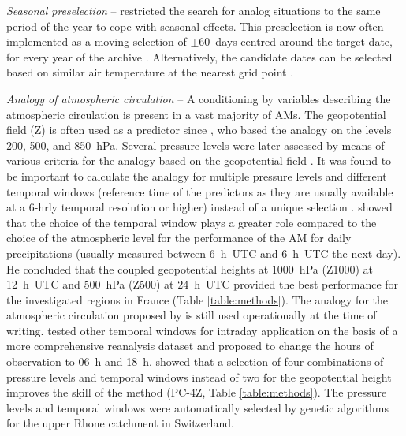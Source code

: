 \documentclass[gmdd]{copernicus}
\begin{document}
\textit{Seasonal preselection} -- \citet{Lorenz1969} restricted the search for analog situations to the same period of the year to cope with seasonal effects. This preselection is now often implemented as a moving selection of $\pm$60~days centred around the target date, for every year of the archive \citep[Table \ref{table:methods},][]{Bontron2004, Marty2012, Horton2012, BenDaoud2016}. Alternatively, the candidate dates can be selected based on similar air temperature at the nearest grid point \citep[Table \ref{table:methods},][]{BenDaoud2016}.

\textit{Analogy of atmospheric circulation} -- A conditioning by variables describing the atmospheric circulation is present in a vast majority of AMs. The geopotential field (Z) is often used as a predictor since \citet{Lorenz1969}, who based the analogy on the levels 200, 500, and 850~hPa. Several pressure levels were later assessed by means of various criteria for the analogy based on the geopotential field \citep{Duband1970, Duband1974, Duband1981, Guilbaud1997}. It was found to be important to calculate the analogy for multiple pressure levels and different temporal windows (reference time of the predictors as they are usually available at a 6-hrly temporal resolution or higher) instead of a unique selection \citep{Guilbaud1998, Obled2002}. \citet{Bontron2004} showed that the choice of the temporal window plays a greater role compared to the choice of the atmospheric level for the performance of the AM for daily precipitations (usually measured between 6~h~UTC and 6~h~UTC the next day). He concluded that the coupled geopotential heights at 1000~hPa (Z1000) at 12~h~UTC and 500~hPa (Z500) at 24~h~UTC provided the best performance \citep[for a subset of the NCEP/NCAR Reanalysis I;][]{Kalnay1996, Kistler2001} for the investigated regions in France (Table \ref{table:methods}). The analogy for the atmospheric circulation proposed by \citet{Bontron2004} is still used operationally at the time of writing. \citet{Marty2010} tested other temporal windows for intraday application on the basis of a more comprehensive reanalysis dataset and proposed to change the hours of observation to 06~h and 18~h. \citet{Horton2018a} showed that a selection of four combinations of pressure levels and temporal windows instead of two for the geopotential height improves the skill of the method (PC-4Z, Table \ref{table:methods}). The pressure levels and temporal windows were automatically selected by genetic algorithms for the upper Rhone catchment in Switzerland.
\end{document}
